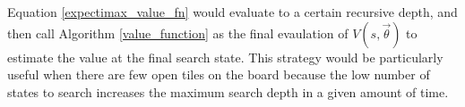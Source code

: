 \documentclass{article}
\begin{document}
Equation \ref{expectimax_value_fn} would evaluate to a certain recursive depth, and then call Algorithm \ref{value_function} as the final evaulation of $V(s, \vec{\theta})$ to estimate the value at the final search state.  This strategy would be particularly useful when there are few open tiles on the board because the low number of states to search increases the maximum search depth in a given amount of time.










    
\end{document}
